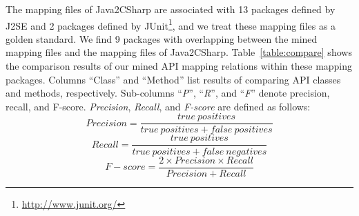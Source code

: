 The mapping files of Java2CSharp are associated with
13 packages defined by J2SE and 2 packages defined by
JUnit\footnote{\url{http://www.junit.org/}}, and we treat these
mapping files as a golden standard. We find 9 packages with overlapping
between the mined mapping files and the mapping files of
Java2CSharp. Table~\ref{table:compare} shows the comparison
results of our mined API mapping relations within these mapping packages.
Columns ``Class'' and ``Method'' list results of comparing API
classes and methods, respectively. Sub-columns
``\emph{P}'', ``\emph{R}'', and ``\emph{F}'' denote precision,
recall, and F-score. \emph{Precision}, \emph{Recall}, and \emph{F-score} are defined as
follows:\vspace*{-1ex}
\begin{equation}\label{eq-precison}
Precision=\frac{true\ positives}{true\ positives+false\ positives}
\end{equation}\vspace*{-2ex}
\begin{equation}\label{eq-recall}
Recall=\frac{true\ positives}{true\ positives+false\ negatives}
\end{equation}\vspace*{-2ex}
\begin{equation}\label{eq-fscore}
F\!-\!score=\frac{2\times Precision \times Recall}{Precision+Recall}
\end{equation}\vspace*{-2ex}

